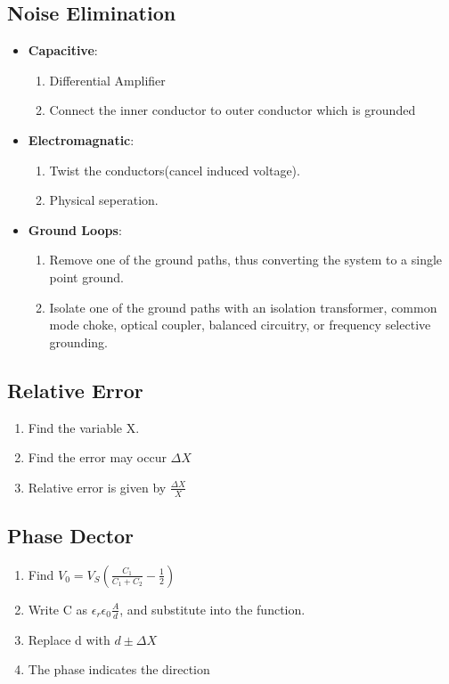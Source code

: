 \documentclass{article}
\begin{document}
  \subsection{Noise Elimination}
  \begin{itemize}
  \item \textbf{Capacitive}: \begin{enumerate}
  \item Differential Amplifier
  \item Connect the inner conductor to outer conductor which is grounded
  \end{enumerate}
  
  \item \textbf{Electromagnatic}: \begin{enumerate}
  \item Twist the conductors(cancel induced voltage).
  \item Physical seperation.
  \end{enumerate}
  
  \item \textbf{Ground Loops}: \begin{enumerate}
  \item Remove one of the ground paths, thus converting the system to a single point ground.
  
  \item Isolate one of the ground paths with an isolation transformer, common mode choke, optical coupler, balanced circuitry, or frequency selective grounding.
  \end{enumerate}
  \end{itemize}
  \subsection{Relative Error}
  \begin{enumerate}
  \item Find the variable X.
  \item Find the error may occur $\Delta X$
  \item Relative error is given by $\frac{\Delta X}{X}$ 
\end{enumerate}    

\subsection{Phase Dector}
  \begin{enumerate}
   \item Find $V_0 = V_S(\frac{C_1}{C_1 + C_2} - \frac{1}{2})$
   \item Write C as $\epsilon_r\epsilon_0 \frac{A}{d}$, and substitute into the function.
   \item Replace d with $d \pm \Delta X$
   \item The phase indicates the direction
  \end{enumerate}
  
  
\end{document}
